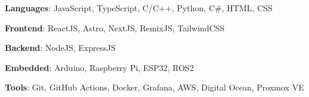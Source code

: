 \textbf{Languages}: JavaScript, TypeScript, C/C++, Python, C\#, HTML, CSS \par
\textbf{Frontend}: ReactJS, Astro, NextJS, RemixJS, TailwindCSS \par
\textbf{Backend}: NodeJS, ExpressJS\par
\textbf{Embedded}: Arduino, Raspberry Pi, ESP32, ROS2 \par
\textbf{Tools}: Git, GitHub Actions, Docker, Grafana, AWS, Digital Ocean, Proxmox VE